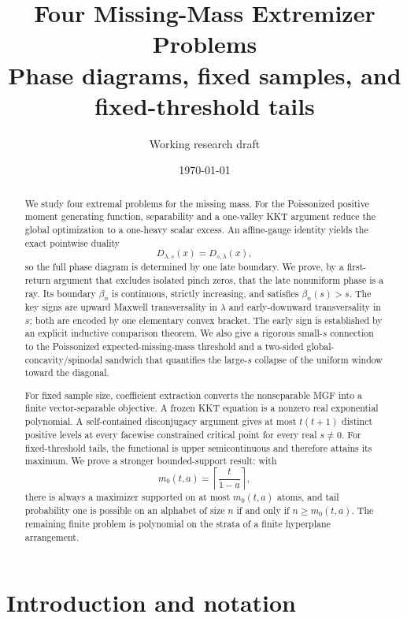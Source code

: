 \documentclass[11pt]{article}
\title{Four Missing-Mass Extremizer Problems\\
\large Phase diagrams, fixed samples, and fixed-threshold tails}
\author{Working research draft}
\date{\today}
\theoremstyle{plain}
\theoremstyle{definition}
\theoremstyle{remark}
\begin{document}
\maketitle

\begin{abstract}
We study four extremal problems for the missing mass.  For the Poissonized positive moment generating function, separability and a one-valley KKT argument reduce the global optimization to a one-heavy scalar excess.  An affine-gauge identity yields the exact pointwise duality
\[
D_{\lambda,s}(x)=D_{s,\lambda}(x),
\]
so the full phase diagram is determined by one late boundary.  We prove, by a first-return argument that excludes isolated pinch zeros, that the late nonuniform phase is a ray.  Its boundary \(\beta_n\) is continuous, strictly increasing, and satisfies \(\beta_n(s)>s\).  The key signs are upward Maxwell transversality in \(\lambda\) and early-downward transversality in \(s\); both are encoded by one elementary convex bracket.  The early sign is established by an explicit inductive comparison theorem.  We also give a rigorous small-\(s\) connection to the Poissonized expected-missing-mass threshold and a two-sided global-concavity/spinodal sandwich that quantifies the large-\(s\) collapse of the uniform window toward the diagonal.

For fixed sample size, coefficient extraction converts the nonseparable MGF into a finite vector-separable objective.  A frozen KKT equation is a nonzero real exponential polynomial.  A self-contained disconjugacy argument gives at most \(t(t+1)\) distinct positive levels at every facewise constrained critical point for every real \(s\ne0\).  For fixed-threshold tails, the functional is upper semicontinuous and therefore attains its maximum.  We prove a stronger bounded-support result: with
\[
m_0(t,a)=\left\lceil \frac{t}{1-a}\right\rceil,
\]
there is always a maximizer supported on at most \(m_0(t,a)\) atoms, and tail probability one is possible on an alphabet of size \(n\) if and only if \(n\ge m_0(t,a)\).  The remaining finite problem is polynomial on the strata of a finite hyperplane arrangement.
\end{abstract}

\tableofcontents

\section{Introduction and notation}
\end{document}
